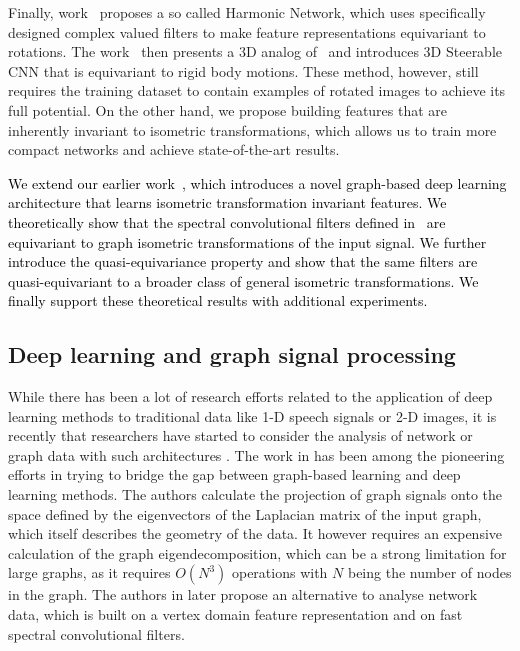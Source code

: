 \documentclass[10pt,journal,compsoc]{IEEEtran}
\newcommand{\renata}[1]{\textcolor{black}{#1}}
\begin{document}
	Finally, work~\cite{bb:harm} proposes a so called Harmonic Network, which uses specifically designed complex valued filters to make feature representations equivariant to rotations. The work~\cite{bb:3dSteerableWeiler} then presents a 3D analog of~\cite{bb:harm}  and introduces 3D Steerable CNN that is equivariant to rigid body motions. These method, however, still requires the training dataset to contain examples of rotated images to achieve its full potential. On the other hand, we propose building features that are inherently invariant to isometric transformations, which allows us to train more compact networks and achieve state-of-the-art results.

	\renata{We extend our earlier work~\cite{bb:KhasanovaF17}, which introduces a novel graph-based deep learning architecture that learns isometric transformation invariant features. We theoretically show that the spectral convolutional filters defined in~\cite{bb:KhasanovaF17} are equivariant to graph isometric transformations of the input signal. We further introduce the quasi-equivariance property and show that the same filters are quasi-equivariant to a broader class of general isometric transformations. We finally support these theoretical results with additional experiments.}


	\subsection{Deep learning and graph signal processing}

	While there has been a lot of research efforts related to the application of deep learning methods to traditional data like 1-D speech signals or 2-D images, it is recently that researchers have started to consider the analysis of network or graph data with such architectures \cite{bb:kipf2016semi, bb:henaff2015deep, bb:nips_fingerprint, bb:Structural-RNN}.
	The work in \cite{bb:bruna-iclr-14} has been among the pioneering efforts in trying to bridge the gap between graph-based learning and deep learning methods. The authors calculate the projection of graph signals onto the space defined by the eigenvectors of the Laplacian matrix of the input graph, which itself describes the geometry of the data. It however requires an expensive calculation of the graph eigendecomposition, which can be a strong limitation for large graphs, as it requires $O(N^3)$ operations with $N$ being the number of nodes in the graph. The authors in \cite{bb:Mikhael} later propose an alternative to analyse network data, which is built on a vertex domain feature representation and on fast spectral convolutional filters.
\end{document}
